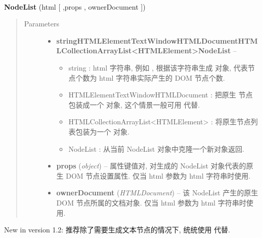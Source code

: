 \documentclass[letterpaper,10pt,english]{sphinxmanual}
\begin{document}
\begin{fulllineitems}
\label{api/core/node/nodelist:Node.NodeList}~
\begin{DUlineblock}{0em}
\item[] \textbf{NodeList} (html {[} ,props , ownerDocument {]})
\end{DUlineblock}
\begin{quote}\begin{description}
\item[{Parameters}] \leavevmode\begin{itemize}
\item {}
\textbf{string\textbar{}HTMLElement\textbar{}Text\textbar{}Window\textbar{}HTMLDocument\textbar{}HTMLCollection\textbar{}ArrayList\textless{}HTMLElement\textgreater{}\textbar{}NodeList} -- \begin{itemize}
\item {}
string : html 字符串, 例如  , 根据该字符串生成  对象, 代表节点个数为 html 字符串实际产生的 DOM 节点个数.

\item {}
HTMLElement\textbar{}Text\textbar{}Window\textbar{}HTMLDocument : 把原生  节点包装成一个  对象, 这个情景一般可用  代替.

\item {}
HTMLCollection\textbar{}ArrayList\textless{}HTMLElement\textgreater{} : 将原生节点列表包装为一个  对象.

\item {}
NodeList : 从当前 NodeList 对象中克隆一个新对象返回.

\end{itemize}


\item {}
\textbf{props} (\emph{object}) -- 属性键值对, 对生成的 NodeList 对象代表的原生 DOM 节点设置属性. 仅当 html 参数为 html 字符串时使用.

\item {}
\textbf{ownerDocument} (\emph{HTMLDocument}) -- 该 NodeList 产生的原生 DOM 节点所属的文档对象. 仅当 html 参数为 html 字符串时使用.

\end{itemize}

\end{description}\end{quote}
New in version 1.2: 推荐除了需要生成文本节点的情况下, 统统使用  代替.
\end{fulllineitems}
\end{document}
